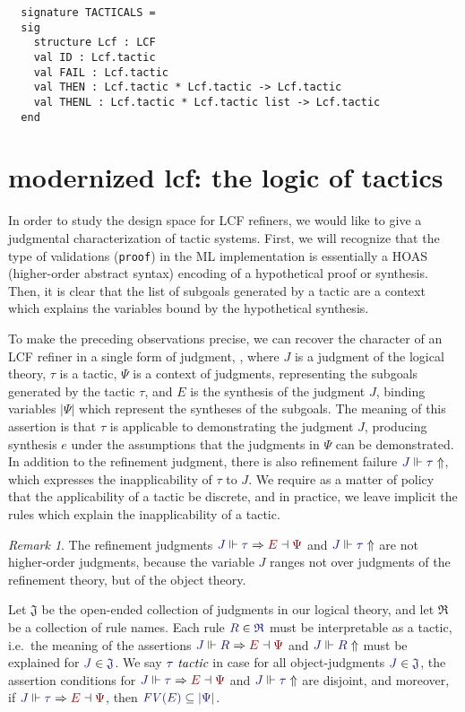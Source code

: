 \documentclass[11pt]{amsart}
\theoremstyle{definition}
\theoremstyle{remark}
\newtheorem{remark}[thm]{Remark}
\numberwithin{equation}{section}
\def\InputModeColorName{MidnightBlue}
\def\OutputModeColorName{Maroon}
\newcommand\InputMode[1]{{\color{\InputModeColorName}{#1}}}
\newcommand\OutputMode[1]{{\color{\OutputModeColorName}{#1}}}
\newcommand\JJ{J}
\newcommand\RSet{\mathfrak{R}}
\newcommand\JSet{\mathfrak{J}}
\newcommand\IsTac[1]{\InputMode{#1}\ \textit{tactic}}
\newcommand\Refine[4]{\InputMode{#1}\Vdash\InputMode{#2}\Rightarrow\OutputMode{#4}\dashv\OutputMode{#3}}
\newcommand\NoRefine[2]{\InputMode{#1}\Vdash\InputMode{#2}\Uparrow}
\newcommand\Member[2]{\InputMode{#1}\in\InputMode{#2}}
\newcommand\Dom[1]{\left\vert#1\right\vert}
\newcommand\SubsetEq[2]{\InputMode{#1}\subseteq\InputMode{#2}}
\newcommand\FV[1]{\textit{FV}\left(#1\right)}
\begin{document}
\begin{lstlisting}
  signature TACTICALS =
  sig
    structure Lcf : LCF
    val ID : Lcf.tactic
    val FAIL : Lcf.tactic
    val THEN : Lcf.tactic * Lcf.tactic -> Lcf.tactic
    val THENL : Lcf.tactic * Lcf.tactic list -> Lcf.tactic
  end
\end{lstlisting}

\section{modernized lcf: the logic of tactics}

In order to study the design space for LCF refiners, we would like to give a
judgmental characterization of tactic systems. First, we will recognize that
the type of validations (\verb!proof!) in the ML implementation is essentially
a HOAS (higher-order abstract syntax) encoding of a hypothetical proof or
synthesis. Then, it is clear that the list of subgoals generated by a tactic
are a context which explains the variables bound by the hypothetical synthesis.

To make the preceding observations precise, we can recover the character of an
LCF refiner in a single form of judgment,
\framebox{$\Refine{\JJ}{\tau}{\Psi}{E}$}, where $\JJ$ is a judgment of the
logical theory, $\tau$ is a tactic, $\Psi$ is a context of judgments,
representing the subgoals generated by the tactic $\tau$, and $E$ is the
synthesis of the judgment $\JJ$, binding variables $\Dom{\Psi}$ which represent
the syntheses of the subgoals. The meaning of this assertion is that $\tau$ is
applicable to demonstrating the judgment $\JJ$, producing synthesis $e$ under
the assumptions that the judgments in $\Psi$ can be demonstrated. In addition
to the refinement judgment, there is also refinement failure
$\NoRefine{\JJ}{\tau}$, which expresses the inapplicability of $\tau$ to $\JJ$.
We require as a matter of policy that the applicability of a tactic be
discrete, and in practice, we leave implicit the rules which explain the
inapplicability of a tactic.

\begin{remark}
  The refinement judgments $\Refine{\JJ}{\tau}{\Psi}{E}$ and
  $\NoRefine{\JJ}{\tau}$ are not higher-order judgments, because the variable
  $\JJ$ ranges not over judgments of the refinement theory, but of the
  object theory.
\end{remark}


Let $\JSet$ be the open-ended collection of judgments in our logical theory,
and let $\RSet$ be a collection of rule names. Each rule $\Member{R}{\RSet}$
must be interpretable as a tactic, i.e.\ the meaning of the assertions
$\Refine{\JJ}{R}{\Psi}{E}$ and $\NoRefine{\JJ}{R}$ must be explained for
$\Member{J}{\JSet}$. We say $\IsTac{\tau}$ in case for all object-judgments
$\Member{\JJ}{\JSet}$, the assertion conditions for
$\Refine{\JJ}{\tau}{\Psi}{E}$ and $\NoRefine{\JJ}{\tau}$ are disjoint, and
moreover, if $\Refine{\JJ}{\tau}{\Psi}{E}$, then
$\SubsetEq{\FV{E}}{\Dom{\Psi}}$.
\end{document}
